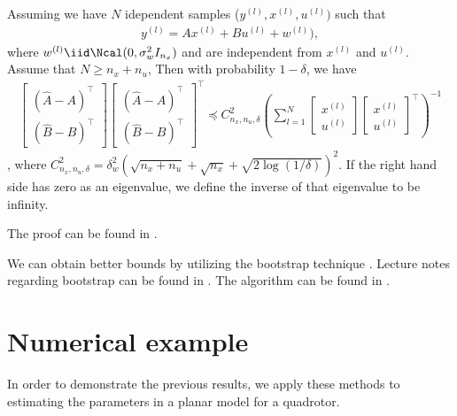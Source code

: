\documentclass{article}[12pt]
\begin{document}
\begin{proposition}
Assuming we have $N$ idependent samples ($y^{(l)}, x^{(l)}, u^{(l)})$ such that
\begin{align*}
y^{(l)} =  Ax^{(l)}+ Bu^{(l)} + w^{(l)}),
\end{align*}
where $w^{(l)} \iid \Ncal(0, \sigma^2_w I_{n_x}) $ and are independent from $x^{(l)}$ and $u^{(l)}$. Assume that $N \geq n_x + n_u$, Then with probability $1-\delta$, we have 
\begin{align*}
\begin{bmatrix}
(\hat{A}-A)^\top \\
(\hat{B}-B)^\top
\end{bmatrix}
\begin{bmatrix}
(\hat{A}-A)^\top \\
(\hat{B}-B)^\top
\end{bmatrix}^\top
\preceq C^2_{n_x, n_u, \delta} 
\left( \sum_{l=1}^{N} 
\begin{bmatrix}
x^{(l)}\\
u^{(l)}
\end{bmatrix}
\begin{bmatrix}
x^{(l)}\\
u^{(l)}
\end{bmatrix}^\top
\right)^{-1}
\end{align*}, 
where $C^2_{n_x, n_u, \delta} = \delta^2_w(\sqrt{n_x+n_u}+\sqrt{n_x }+ \sqrt{2\log(1/\delta)})^2$.
If the right hand side has zero as an eigenvalue, we define the inverse of that eigenvalue to be infinity. 
\end{proposition}
The proof can be found in \cite{dean_sample_2017}.

We can obtain better bounds by utilizing the bootstrap technique \cite{efron_bootstrap_1979}. Lecture notes regarding bootstrap can be found in \cite{cmu_lect_13}.
The algorithm can be found in \cite{matni_tutorial_2019}.

\section{Numerical example}
In order to demonstrate the previous results, we apply these methods to estimating the parameters in a planar model for a quadrotor. 

\end{document}
